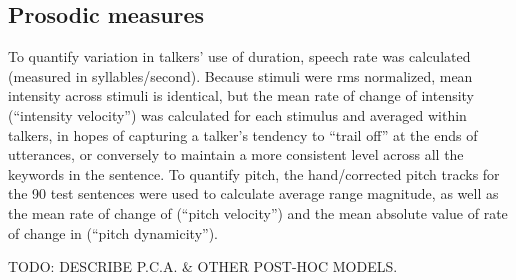\subsection{Prosodic measures}
To quantify variation in talkers’ use of duration, speech rate was calculated (measured in syllables/second).  Because stimuli were \ac{rms} normalized, mean intensity across stimuli is identical, but the mean rate of change of intensity (“intensity velocity”) was calculated for each stimulus and averaged within talkers, in hopes of capturing a talker’s tendency to “trail off” at the ends of utterances, or conversely to maintain a more consistent level across all the keywords in the sentence.  To quantify pitch, the hand\-/corrected pitch tracks for the 90 test sentences were used to calculate average \fo{} range magnitude, as well as the mean rate of change of \fo{} (“pitch velocity”) and the mean absolute value of rate of change in \fo{} (“pitch dynamicity”).

TODO: DESCRIBE P.C.A. \& OTHER POST-HOC MODELS.

